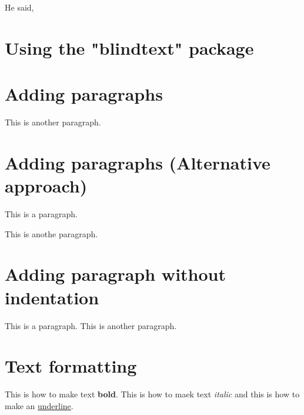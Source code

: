 \documentclass{article}
\begin{document}
He said, 

\section{Using the "blindtext" package}

\blindtext

\section{Adding paragraphs}

\blindtext

This is another paragraph.

\section{Adding paragraphs (Alternative approach)}

This is a paragraph. \par This is anothe paragraph.

\section{Adding paragraph without indentation}
This is a paragraph.
\newline This is another paragraph.

\section{Text formatting}
This is how to make text \textbf{bold}. This is how to
maek text \textit{italic} and this is how to make an
\underline{underline}.
\end{document}
